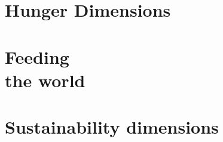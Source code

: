 \documentclass[print,Draft]{faosyb}
\begin{document}
\part{Hunger Dimensions}
\lipsum
\EndPartIntro




\begin{tablepages}
\section{}
\small
  
\clearpage

\end{tablepages}


\part[Feeding the world]{Feeding\\ the world}
\lipsum
\EndPartIntro




\begin{tablepages}
\section{}
\small
  
\clearpage

\end{tablepages}


\part[Sustainability dimensions]{Sustain\-ability dimensions}
\lipsum
\EndPartIntro




\begin{tablepages}
\section{}
\small
  
\clearpage

\end{tablepages}
\end{document}
